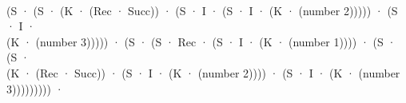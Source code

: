 \documentclass{entcs} \usepackage{prentcsmacro}
\newcommand{\AgdaFontStyle}[1]{\textsf{#1}}
\newcommand{\AgdaNumber}      [1]{\textcolor{AgdaNumber}{#1}}
\newcommand{\AgdaSymbol}      [1]{\textcolor{AgdaSymbol}{#1}}
\newcommand{\AgdaInductiveConstructor}[1]
    {\AgdaFontStyle{\textcolor{AgdaInductiveConstructor}{#1}}}
\newcommand{\AgdaFunction} [1]{\AgdaFontStyle{\textcolor{AgdaFunction}{#1}}}
\newcommand{\AgdaIndent}[1]{\quad}
\newcommand{\AgdaCodeStyle}{\small}
\newenvironment{code}%
{\noindent\AgdaCodeStyle\pboxed}%
{\endpboxed\par\noindent%
\ignorespacesafterend}
\begin{document}
\begin{code}
\>[100]\<%
\\
\>[0]\AgdaIndent{21}{}\<[21]%
\>[21]\AgdaSymbol{(}\AgdaInductiveConstructor{S} \AgdaInductiveConstructor{·} \AgdaSymbol{(}\AgdaInductiveConstructor{S} \AgdaInductiveConstructor{·} \AgdaSymbol{(}\AgdaInductiveConstructor{K} \AgdaInductiveConstructor{·} \AgdaSymbol{(}\AgdaInductiveConstructor{Rec} \AgdaInductiveConstructor{·} \AgdaInductiveConstructor{Succ}\AgdaSymbol{))} \AgdaInductiveConstructor{·} \AgdaSymbol{(}\AgdaInductiveConstructor{S} \AgdaInductiveConstructor{·} \AgdaFunction{I} \AgdaInductiveConstructor{·} \AgdaSymbol{(}\AgdaInductiveConstructor{S} \AgdaInductiveConstructor{·} \AgdaFunction{I} \AgdaInductiveConstructor{·} \AgdaSymbol{(}\AgdaInductiveConstructor{K} \AgdaInductiveConstructor{·} \AgdaSymbol{(}\AgdaFunction{number} \AgdaNumber{2}\AgdaSymbol{)))))} \AgdaInductiveConstructor{·} \AgdaSymbol{(}\AgdaInductiveConstructor{S} \AgdaInductiveConstructor{·} \AgdaFunction{I} \AgdaInductiveConstructor{·} \<[101]%
\>[101]\<%
\\
\>[0]\AgdaIndent{21}{}\<[21]%
\>[21]\AgdaSymbol{(}\AgdaInductiveConstructor{K} \AgdaInductiveConstructor{·} \AgdaSymbol{(}\AgdaFunction{number} \AgdaNumber{3}\AgdaSymbol{)))))} \AgdaInductiveConstructor{·} \AgdaSymbol{(}\AgdaInductiveConstructor{S} \AgdaInductiveConstructor{·} \AgdaSymbol{(}\AgdaInductiveConstructor{S} \AgdaInductiveConstructor{·} \AgdaInductiveConstructor{Rec} \AgdaInductiveConstructor{·} \AgdaSymbol{(}\AgdaInductiveConstructor{S} \AgdaInductiveConstructor{·} \AgdaFunction{I} \AgdaInductiveConstructor{·} \AgdaSymbol{(}\AgdaInductiveConstructor{K} \AgdaInductiveConstructor{·} \AgdaSymbol{(}\AgdaFunction{number} \AgdaNumber{1}\AgdaSymbol{))))} \AgdaInductiveConstructor{·} \AgdaSymbol{(}\AgdaInductiveConstructor{S} \AgdaInductiveConstructor{·} \AgdaSymbol{(}\AgdaInductiveConstructor{S} \AgdaInductiveConstructor{·}\<%
\\
\>[0]\AgdaIndent{21}{}\<[21]%
\>[21]\AgdaSymbol{(}\AgdaInductiveConstructor{K} \AgdaInductiveConstructor{·} \AgdaSymbol{(}\AgdaInductiveConstructor{Rec} \AgdaInductiveConstructor{·} \AgdaInductiveConstructor{Succ}\AgdaSymbol{))} \AgdaInductiveConstructor{·} \AgdaSymbol{(}\AgdaInductiveConstructor{S} \AgdaInductiveConstructor{·} \AgdaFunction{I} \AgdaInductiveConstructor{·} \AgdaSymbol{(}\AgdaInductiveConstructor{K} \AgdaInductiveConstructor{·} \AgdaSymbol{(}\AgdaFunction{number} \AgdaNumber{2}\AgdaSymbol{))))} \AgdaInductiveConstructor{·} \AgdaSymbol{(}\AgdaInductiveConstructor{S} \AgdaInductiveConstructor{·} \AgdaFunction{I} \AgdaInductiveConstructor{·} \AgdaSymbol{(}\AgdaInductiveConstructor{K} \AgdaInductiveConstructor{·} \AgdaSymbol{(}\AgdaFunction{number} \AgdaNumber{3}\AgdaSymbol{)))))))))} \AgdaInductiveConstructor{·} \<[107]%

\end{code}
\end{document}
